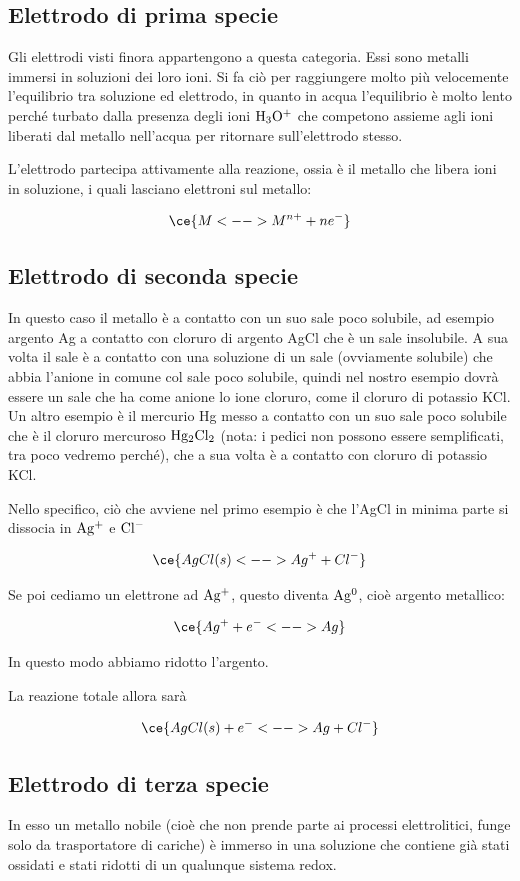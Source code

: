 \subsection{Elettrodo di prima specie}
Gli elettrodi visti finora appartengono a questa categoria. Essi sono metalli immersi in soluzioni dei loro ioni. Si fa ciò per raggiungere molto più velocemente l'equilibrio tra soluzione ed elettrodo, in quanto in acqua l'equilibrio è molto lento perché turbato dalla presenza degli ioni $\rm H_3O^+$ che competono assieme agli ioni liberati dal metallo nell'acqua per ritornare sull'elettrodo stesso.

L'elettrodo partecipa attivamente alla reazione, ossia è il metallo che libera ioni in soluzione, i quali lasciano elettroni sul metallo:

$$\ce{M <--> M^{n+} + ne^-}$$
\subsection{Elettrodo di seconda specie}
In questo caso il metallo è a contatto con un suo sale poco solubile, ad esempio argento Ag a contatto con cloruro di argento AgCl che è un sale insolubile. A sua volta il sale è a contatto con una soluzione di un sale (ovviamente solubile) che abbia l'anione in comune col sale poco solubile, quindi nel nostro esempio dovrà essere un sale che ha come anione lo ione cloruro, come il cloruro di potassio KCl. Un altro esempio è il mercurio Hg messo a contatto con un suo sale poco solubile che è il cloruro mercuroso $\rm Hg_2Cl_2$ (nota: i pedici non possono essere semplificati, tra poco vedremo perché), che a sua volta è a contatto con cloruro di potassio KCl.

Nello specifico, ciò che avviene nel primo esempio è che l'AgCl in minima parte si dissocia in $\rm Ag^+$ e $\rm Cl^-$

$$\ce{AgCl(s) <--> Ag^+ + Cl^-}$$

Se poi cediamo un elettrone ad $\rm Ag^+$, questo diventa $\rm Ag^0$, cioè argento metallico:

$$\ce{Ag^+ + e^- <--> Ag}$$

In questo modo abbiamo ridotto l'argento.

La reazione totale allora sarà

$$\ce{AgCl(s) + e^- <--> Ag + Cl^-}$$
\subsection{Elettrodo di terza specie}
In esso un metallo nobile (cioè che non prende parte ai processi elettrolitici, funge solo da trasportatore di cariche) è immerso in una soluzione che contiene già stati ossidati e stati ridotti di un qualunque sistema redox.

